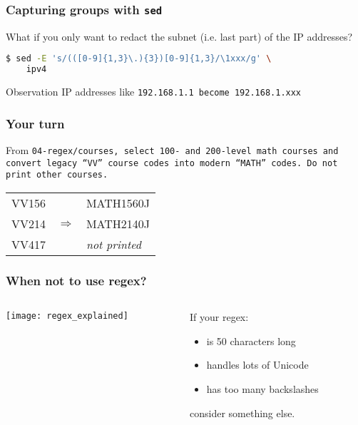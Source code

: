 \begin{frame}[fragile]
\frametitle{Capturing groups with \tt{sed}}
What if you only want to redact the subnet (i.e. last part) of the IP addresses?
\begin{lstlisting}[language=bash]
$ sed -E 's/(([0-9]{1,3}\.){3})[0-9]{1,3}/\1xxx/g' \
    ipv4
\end{lstlisting}
\begin{block}{Observation}
    IP addresses like \tt{192.168.1.1} become \tt{192.168.1.xxx}
\end{block}
\end{frame}

\begin{frame}[fragile]
\frametitle{Your turn}
From \tt{04-regex/courses}, select 100- and 200-level math courses and convert
legacy ``VV'' course codes into modern ``MATH'' codes.
Do not print other courses.
\begin{example}
    \begin{tabular}{lcl}
        VV156 & & MATH1560J \\
        VV214 & $\Longrightarrow$ & MATH2140J \\
        VV417 & & \textit{not printed}
    \end{tabular}
\end{example}
\end{frame}

\begin{frame}
\frametitle{When not to use regex?}
\begin{columns}
    \begin{column}{0.7\textwidth}
        \texttt{[image: regex\_explained]}
    \end{column}
    \begin{column}{0.3\textwidth}
        If your regex:
        \begin{itemize}
            \item is 50 characters long
            \item handles lots of Unicode
            \item has too many backslashes
        \end{itemize}
        consider something else.
    \end{column}
\end{columns}
\end{frame}

